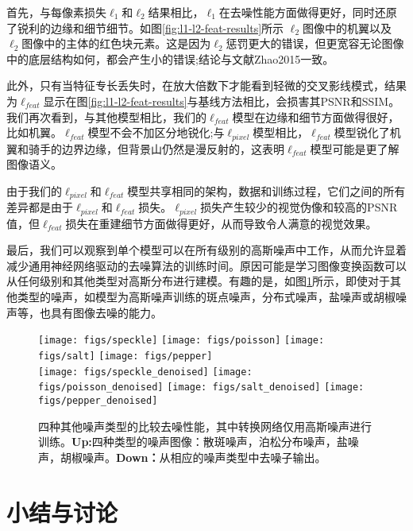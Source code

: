 首先，与每像素损失$ \ell_{1} $和$ \ell_{2} $结果相比，$ \ell_{1} $在去噪性能方面做得更好，同时还原了锐利的边缘和细节细节。如图\ref{fig:l1-l2-feat-results}所示
$ \ell_{2} $图像中的机翼以及$ \ell_{2} $图像中的主体的红色块元素。这是因为$ \ell_{2} $惩罚更大的错误，但更宽容无论图像中的底层结构如何，都会产生小的错误;结论与文献{Zhao2015}一致。

此外，只有当特征专长丢失时，在放大倍数下才能看到轻微的交叉影线模式，结果为$ \ell_{feat} $显示在图\ref{fig:l1-l2-feat-results}与基线方法相比，会损害其PSNR和SSIM。我们再次看到，与其他模型相比，我们的$ \ell_{feat} $模型在边缘和细节方面做得很好，比如机翼。$ \ell_{feat} $模型不会不加区分地锐化;与$ \ell_{pixel} $模型相比，$ \ell_{feat} $模型锐化了机翼和骑手的边界边缘，但背景山仍然是漫反射的，这表明$ \ell_{feat} $模型可能是更了解图像语义。

由于我们的$ \ell_{pixel} $和$ \ell_{feat} $模型共享相同的架构，数据和训练过程，它们之间的所有差异都是由于$ \ell_{pixel} $和$ \ell_{feat} $损失。$ \ell_{pixel} $损失产生较少的视觉伪像和较高的PSNR值，但$ \ell_{feat} $损失在重建细节方面做得更好，从而导致令人满意的视觉效果。

最后，我们可以观察到单个模型可以在所有级别的高斯噪声中工作，从而允许显着减少通用神经网络驱动的去噪算法的训练时间。原因可能是学习图像变换函数可以从任何级别和其他类型对高斯分布进行建模。有趣的是，如图\ref{fig:other-type-results}所示，即使对于其他类型的噪声，如模型为高斯噪声训练的斑点噪声，分布式噪声，盐噪声或胡椒噪声等，也具有图像去噪的能力。

\begin{figure}[t]
 \centering
   \texttt{[image: figs/speckle]}
  \texttt{[image: figs/poisson]}
  \texttt{[image: figs/salt]}
  \texttt{[image: figs/pepper]} \\{}
  \texttt{[image: figs/speckle\_denoised]}
  \texttt{[image: figs/poisson\_denoised]}
  \texttt{[image: figs/salt\_denoised]}
  \texttt{[image: figs/pepper\_denoised]} \\
    
   \caption{四种其他噪声类型的比较去噪性能，其中转换网络仅用高斯噪声进行训练。\textbf{Up:}四种类型的噪声图像：散斑噪声，泊松分布噪声，盐噪声，胡椒噪声。\textbf{Down：}从相应的噪声类型中去噪子输出。
   }
   \vspace{-4mm}
   \label{fig:other-type-results}
 \end{figure}
 

\section{小结与讨论}

